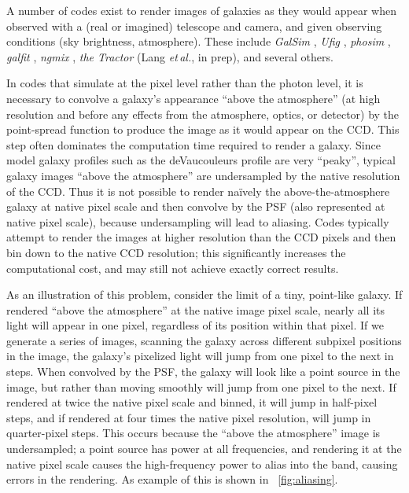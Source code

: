 \documentclass[11pt,letterpaper]{aastex63}
\newcommand{\foreign}[1]{\emph{#1}}
\newcommand{\etal}{\foreign{et\,al.}}
\newcommand{\figref}[1]{\figurename~\ref{#1}}
\newcommand{\project}[1]{\textsl{#1}}
\begin{document}
A number of codes exist to render images of galaxies as they would
appear when observed with a (real or imagined) telescope and camera,
and given observing conditions (sky brightness, atmosphere).  These
include \project{GalSim} \citep{galsim}, \project{Ufig} \citep{ufig},
\project{phosim} \citep{phosim}, \project{galfit} \citep{galfit}, 
\project{ngmix} \citep{ngmix},
\project{the Tractor} (Lang \etal, in prep), and several others.


In codes that simulate at the pixel level rather than the photon
level, it is necessary to convolve a galaxy's appearance ``above the
atmosphere'' (at high resolution and before any effects from the
atmosphere, optics, or detector) by the point-spread function to
produce the image as it would appear on the CCD.  This step often
dominates the computation time required to render a galaxy.  Since
model galaxy profiles such as the deVaucouleurs profile are very
``peaky'', typical galaxy images ``above the atmosphere'' are
undersampled by the native resolution of the CCD.  Thus it is not
possible to render na\"ively the above-the-atmosphere galaxy at native
pixel scale and then convolve by the PSF (also represented at native
pixel scale), because undersampling will lead to aliasing.
Codes typically attempt to render the images at higher resolution than the
CCD pixels and then bin down to the native CCD resolution; this
significantly increases the computational cost, and may still not
achieve exactly correct results.



As an illustration of this problem, consider the limit of a tiny,
point-like galaxy.  If rendered ``above the atmosphere'' at the native
image pixel scale, nearly all its light will appear in one pixel,
regardless of its position within that pixel.  If we generate a series
of images, scanning the galaxy across different subpixel positions in
the image, the galaxy's pixelized light will jump from one pixel to
the next in steps.  When convolved by the PSF, the galaxy will look
like a point source in the image, but rather than moving smoothly will
jump from one pixel to the next.  If rendered at twice the native pixel
scale and binned, it will jump in half-pixel steps, and if rendered at
four times the native pixel resolution, will jump in quarter-pixel
steps.  This occurs because the ``above the atmosphere'' image is
undersampled; a point source has power at all frequencies, and
rendering it at the native pixel scale causes the high-frequency power
to alias into the band, causing errors in the rendering.  As example of this
is shown in \figref{fig:aliasing}.
\end{document}
